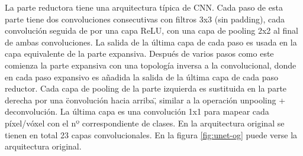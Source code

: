 La parte reductora tiene una arquitectura típica de CNN. Cada paso de esta parte tiene dos convoluciones consecutivas con filtros 3x3 (sin padding), cada convolución seguida de por una capa ReLU, con una capa de pooling 2x2 al final de ambas convoluciones. La salida de la última capa de cada paso es usada en la capa equivalente de la parte expansiva. Después de varios pasos como este comienza la parte expansiva con una topología inversa a la convolucional, donde en cada paso expansivo es añadida la salida de la última capa de cada paso reductor. Cada capa de pooling de la parte izquierda es sustituida en la parte derecha por una \"convolución hacia arriba\", similar a la operación unpooling + deconvolución. La última capa es una convolución 1x1 para mapear cada píxel/vóxel con el nº correspondiente de clases. En la arquitectura original se tienen en total 23 capas convolucionales. En la figura \ref{fig:unet-og} puede verse la arquitectura original.

